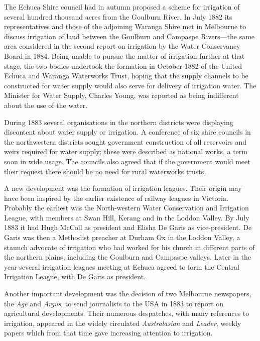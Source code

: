 The Echuca Shire council had in autumn proposed a scheme for
irrigation of several hundred thousand acres from the Goulburn
River. In July 1882 its representatives and those of the adjoining
Waranga Shire met in Melbourne to discuss irrigation of land between
the Goulburn and Campaspe Rivers---the same area considered in the
second report on irrigation by the Water Conservancy Board in
1884. Being unable to pursue the matter of irrigation further at that
stage, the two bodies undertook the formation in October 1882 of the
United Echuca and Waranga Waterworks Trust, hoping that the supply
channels to be constructed for water supply would also serve for
delivery of irrigation water.  The Minister for Water Supply, Charles
Young, was reported as being indifferent about the use of the
water.

During 1883 several organisations in the northern districts were
displaying discontent about water supply or irrigation.  A conference
of six shire councils in the northwestern districts sought government
construction of all reservoirs and weirs required for water supply;
these were described as national works, a term soon in wide usage.
The councils also agreed that if the government would meet their
request there should be no need for rural waterworks
trusts.

A new development was the formation of irrigation leagues.  Their
origin may have been inspired by the earlier existence of railway
leagues in Victoria.  Probably the earliest was the North-western
Water Conservation and Irrigation League, with members at Swan Hill,
Kerang and in the Loddon Valley.  By July 1883 it had Hugh McColl as
president and Elisha De Garis as vice-president. De Garis was then a
Methodist preacher at Durham Ox in the Loddon Valley, a staunch
advocate of irrigation who had worked for his church in different
parts of the northern plains, including the Goulburn and Campaspe
valleys.  Later in the year several irrigation leagues meeting at
Echuca agreed to form the Central Irrigation League, with De Garis as
president.

Another important development was the decision of two Melbourne
newspapers, the \textsl{Age} and \textsl{Argus}, to send journalists
to the USA in 1883 to report on agricultural developments.  Their
numerous despatches, with many references to irrigation, appeared in
the widely circulated \textsl{Australasian} and \textsl{Leader},
weekly papers which from that time gave increasing attention to
irrigation.

